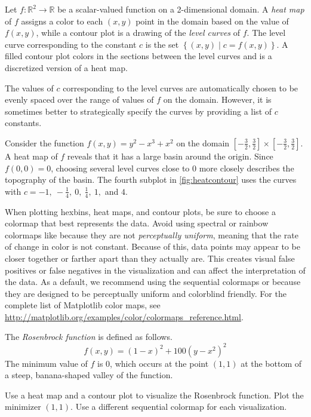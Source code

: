 Let $f:\mathbb{R}^2\rightarrow\mathbb{R}$ be a scalar-valued function on a 2-dimensional domain.
A \emph{heat map} of $f$ assigns a color to each $(x,y)$ point in the domain based on the value of $f(x,y)$, while a contour plot is a drawing of the \emph{level curves} of $f$.
The level curve corresponding to the constant $c$ is the set $\left\{(x,y)\mid c = f(x,y)\right\}$.
A filled contour plot colors in the sections between the level curves and is a discretized version of a heat map.

The values of $c$ corresponding to the level curves are automatically chosen to be evenly spaced over the range of values of $f$ on the domain.
However, it is sometimes better to strategically specify the curves by providing a list of $c$ constants.

Consider the function $f(x,y) = y^2 - x^3 + x^2$ on the domain $[-\frac{3}{2}, \frac{3}{2}] \times [-\frac{3}{2}, \frac{3}{2}]$.
A heat map of $f$ reveals that it has a large basin around the origin.
Since $f(0,0) = 0$, choosing several level curves close to $0$ more closely describes the topography of the basin.
The fourth subplot in \ref{fig:heatcontour} uses the curves with $c = -1,\ -\frac{1}{4},\ 0,\ \frac{1}{4},\ 1,$ and $4$.

When plotting hexbins, heat maps, and contour plots, be sure to choose a colormap that best represents the data.
Avoid using spectral or rainbow colormaps like  because they are not \emph{perceptually uniform}, meaning that the rate of change in color is not constant.
Because of this, data points may appear to be closer together or farther apart than they actually are.
This creates visual false positives or false negatives in the visualization and can affect the interpretation of the data.
As a default, we recommend using the sequential colormaps  or  because they are designed to be perceptually uniform and colorblind friendly.
For the complete list of Matplotlib color maps, see \url{http://matplotlib.org/examples/color/colormaps_reference.html}.

\begin{problem} %
The \emph{Rosenbrock function} is defined as follows.
\[f(x,y) = (1-x)^2 + 100(y-x^2)^2\]
The minimum value of $f$ is $0$, which occurs at the point $(1,1)$ at the bottom of a steep, banana-shaped valley of the function.

Use a heat map and a contour plot to visualize the Rosenbrock function.
Plot the minimizer $(1,1)$.
Use a different sequential colormap for each visualization.
\end{problem}

